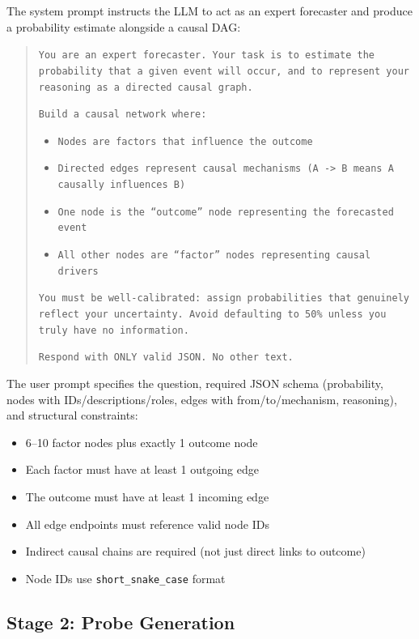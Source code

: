 \documentclass[11pt]{article}
\begin{document}
The system prompt instructs the LLM to act as an expert forecaster and produce a probability estimate alongside a causal DAG:

\begin{quote}
\small
\texttt{You are an expert forecaster. Your task is to estimate the probability that a given event will occur, and to represent your reasoning as a directed causal graph.}

\texttt{Build a causal network where:}
\begin{itemize}
\small
\item \texttt{Nodes are factors that influence the outcome}
\item \texttt{Directed edges represent causal mechanisms (A -> B means A causally influences B)}
\item \texttt{One node is the ``outcome'' node representing the forecasted event}
\item \texttt{All other nodes are ``factor'' nodes representing causal drivers}
\end{itemize}

\texttt{You must be well-calibrated: assign probabilities that genuinely reflect your uncertainty. Avoid defaulting to 50\% unless you truly have no information.}

\texttt{Respond with ONLY valid JSON. No other text.}
\end{quote}

The user prompt specifies the question, required JSON schema (probability, nodes with IDs/descriptions/roles, edges with from/to/mechanism, reasoning), and structural constraints:
\begin{itemize}
\small
\item 6--10 factor nodes plus exactly 1 outcome node
\item Each factor must have at least 1 outgoing edge
\item The outcome must have at least 1 incoming edge
\item All edge endpoints must reference valid node IDs
\item Indirect causal chains are required (not just direct links to outcome)
\item Node IDs use \texttt{short\_snake\_case} format
\end{itemize}

\subsection{Stage 2: Probe Generation}
\label{app:prompt-probe-gen}
\end{document}
